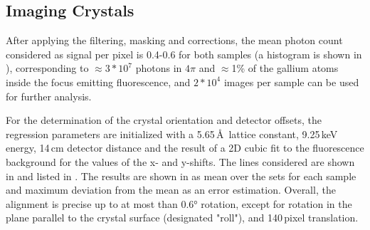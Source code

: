 \subsection{Imaging Crystals}

After applying the filtering, masking and corrections, the mean photon count considered as signal per pixel is 0.4-0.6 for both samples (a histogram is shown in ), corresponding to $\approx 3*10^7$ photons in $4\pi$ and $\approx$1\% of the gallium atoms inside the focus emitting fluorescence, and $2*10^4$ images per sample can be used for further analysis.

For the determination of the crystal orientation and detector offsets, the regression parameters are initialized with a 5.65\,\AA\, lattice constant, 9.25\,keV energy, 14\,cm detector distance and the result of a 2D cubic fit to the fluorescence background for the values of the x- and y-shifts. The  lines considered are shown in  and listed in . The results are shown in  as mean over the sets for each sample and maximum deviation from the mean as an error estimation. Overall, the alignment is precise up to at most than 0.6° rotation, except for rotation in the plane parallel to the crystal surface (designated "roll"), and 140\,pixel translation.


